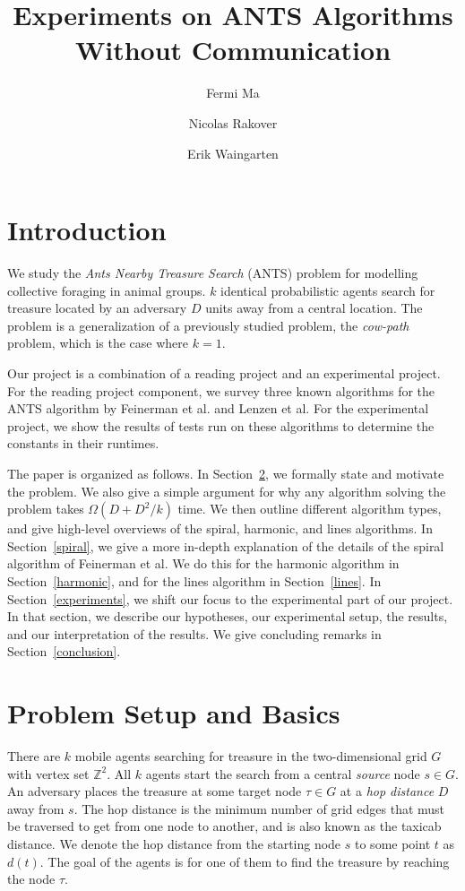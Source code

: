 \documentclass[runningheads,a4paper]{llncs}
\begin{document}
\mainmatter  

\title{Experiments on ANTS Algorithms Without Communication}
\author{Fermi Ma \and Nicolas Rakover \and Erik Waingarten}

\maketitle

\section{Introduction}

We study the \emph{Ants Nearby Treasure Search} (ANTS) problem for modelling collective foraging in animal groups. $k$ identical probabilistic agents search for treasure located by an adversary $D$ units away from a central location. The problem is a generalization of a previously studied problem, the \emph{cow-path} problem, which is the case where $k = 1$. 

Our project is a combination of a reading project and an experimental project. For the reading project component, we survey three known algorithms for the ANTS algorithm by Feinerman et al. and Lenzen et al. For the experimental project, we show the results of tests run on these algorithms to determine the constants in their runtimes.

The paper is organized as follows. In Section~\ref{problem statement}, we formally state and motivate the problem. We also give a simple argument for why any algorithm solving the problem takes $\Omega(D+D^2/k)$ time. We then outline different algorithm types, and give high-level overviews of the spiral, harmonic, and lines algorithms. In Section~\ref{spiral}, we give a more in-depth explanation of the details of the spiral algorithm of Feinerman et al. We do this for the harmonic algorithm in Section~\ref{harmonic}, and for the lines algorithm in Section~\ref{lines}. In Section~\ref{experiments}, we shift our focus to the experimental part of our project. In that section, we describe our hypotheses, our experimental setup, the results, and our interpretation of the results. We give concluding remarks in Section~\ref{conclusion}. 

\section{Problem Setup and Basics}
\label{problem statement}

There are $k$ mobile agents searching for treasure in the two-dimensional grid $G$ with vertex set $\mathbb{Z}^2$. All $k$ agents start the search from a central \emph{source} node $s \in G$. An adversary places the treasure at some target node $\tau \in G$ at a \emph{hop distance} $D$ away from $s$. The hop distance is the minimum number of grid edges that must be traversed to get from one node to another, and is also known as the taxicab distance. We denote the hop distance from the starting node $s$ to some point $t$ as $d(t)$. The goal of the agents is for one of them to find the treasure by reaching the node $\tau$.
\end{document}
